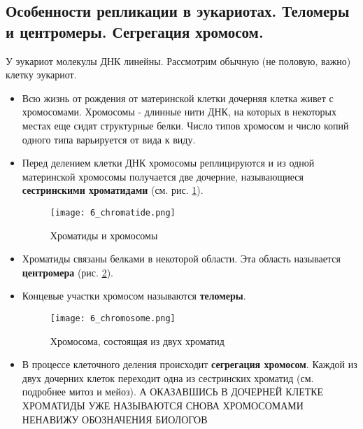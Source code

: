 \subsection{Особенности репликации в эукариотах. Теломеры и центромеры. Сегрегация хромосом.}

У эукариот молекулы ДНК линейны. Рассмотрим обычную (не половую, важно) клетку эукариот. 

\begin{itemize}
    \item Всю жизнь от рождения от материнской клетки дочерняя клетка живет с хромосомами. Хромосомы - длинные нити ДНК, на которых в некоторых местах еще сидят структурные белки. Число типов хромосом и число копий одного типа варьируется от вида к виду.
    
    \item Перед делением клетки ДНК хромосомы реплицируются и из одной материнской хромосомы получается две дочерние, называющиеся \textbf{сестринскими хроматидами} (см. рис. \ref{fig:6_chromatide}).
    
    \begin{figure}[h!]
        \centering
        \texttt{[image: 6\_chromatide.png]}
        \caption{Хроматиды и хромосомы}
        \label{fig:6_chromatide}
    \end{figure}
    
    \item Хроматиды связаны белками в некоторой области. Эта область называется \textbf{центромера} (рис. \ref{fig:6_chromosome}).
    
    \item Концевые участки хромосом называются \textbf{теломеры}.
    
    \begin{figure}[h!]
        \centering
        \texttt{[image: 6\_chromosome.png]}
        \caption{Хромосома, состоящая из двух хроматид}
        \label{fig:6_chromosome}
    \end{figure}
    
    \item В процессе клеточного деления происходит \textbf{сегрегация хромосом}. Каждой из двух дочерних клеток переходит одна из сестринских хроматид (см. подробнее митоз и мейоз). А ОКАЗАВШИСЬ В ДОЧЕРНЕЙ КЛЕТКЕ ХРОМАТИДЫ УЖЕ НАЗЫВАЮТСЯ СНОВА ХРОМОСОМАМИ НЕНАВИЖУ ОБОЗНАЧЕНИЯ БИОЛОГОВ
\end{itemize}
